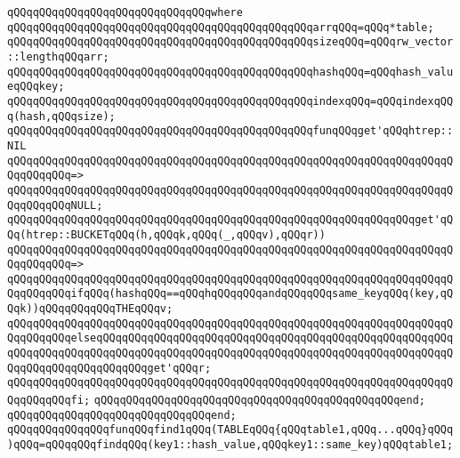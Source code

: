 \verb|qQQqqQQqqQQqqQQqqQQqqQQqqQQqqQQqwhere|\newline
\newline
\verb|qQQqqQQqqQQqqQQqqQQqqQQqqQQqqQQqqQQqqQQqqQQqqQQqarrqQQq=qQQq*table;|\newline
\verb|qQQqqQQqqQQqqQQqqQQqqQQqqQQqqQQqqQQqqQQqqQQqqQQqsizeqQQq=qQQqrw_vector::lengthqQQqarr;|\newline
\verb|qQQqqQQqqQQqqQQqqQQqqQQqqQQqqQQqqQQqqQQqqQQqqQQqhashqQQq=qQQqhash_valueqQQqkey;|\newline
\verb|qQQqqQQqqQQqqQQqqQQqqQQqqQQqqQQqqQQqqQQqqQQqqQQqindexqQQq=qQQqindexqQQq(hash,qQQqsize);|\newline
\newline
\verb|qQQqqQQqqQQqqQQqqQQqqQQqqQQqqQQqqQQqqQQqqQQqqQQqfunqQQqget'qQQqhtrep::NIL|\newline
\verb|qQQqqQQqqQQqqQQqqQQqqQQqqQQqqQQqqQQqqQQqqQQqqQQqqQQqqQQqqQQqqQQqqQQqqQQqqQQqqQQq=>|\newline
\verb|qQQqqQQqqQQqqQQqqQQqqQQqqQQqqQQqqQQqqQQqqQQqqQQqqQQqqQQqqQQqqQQqqQQqqQQqqQQqqQQqNULL;|\newline
\newline
\verb|qQQqqQQqqQQqqQQqqQQqqQQqqQQqqQQqqQQqqQQqqQQqqQQqqQQqqQQqqQQqqQQqget'qQQq(htrep::BUCKETqQQq(h,qQQqk,qQQq(_,qQQqv),qQQqr))|\newline
\verb|qQQqqQQqqQQqqQQqqQQqqQQqqQQqqQQqqQQqqQQqqQQqqQQqqQQqqQQqqQQqqQQqqQQqqQQqqQQqqQQq=>|\newline
\verb|qQQqqQQqqQQqqQQqqQQqqQQqqQQqqQQqqQQqqQQqqQQqqQQqqQQqqQQqqQQqqQQqqQQqqQQqqQQqqQQqifqQQq(hashqQQq==qQQqhqQQqqQQqandqQQqqQQqsame_keyqQQq(key,qQQqk))qQQqqQQqqQQqTHEqQQqv;|\newline
\verb|qQQqqQQqqQQqqQQqqQQqqQQqqQQqqQQqqQQqqQQqqQQqqQQqqQQqqQQqqQQqqQQqqQQqqQQqqQQqqQQqelseqQQqqQQqqQQqqQQqqQQqqQQqqQQqqQQqqQQqqQQqqQQqqQQqqQQqqQQqqQQqqQQqqQQqqQQqqQQqqQQqqQQqqQQqqQQqqQQqqQQqqQQqqQQqqQQqqQQqqQQqqQQqqQQqqQQqqQQqqQQqqQQqqQQqget'qQQqr;|\newline
\verb|qQQqqQQqqQQqqQQqqQQqqQQqqQQqqQQqqQQqqQQqqQQqqQQqqQQqqQQqqQQqqQQqqQQqqQQqqQQqqQQqfi;|\newline
\verb|qQQqqQQqqQQqqQQqqQQqqQQqqQQqqQQqqQQqqQQqqQQqqQQqend;|\newline
\verb|qQQqqQQqqQQqqQQqqQQqqQQqqQQqqQQqend;|\newline
\newline
\verb|qQQqqQQqqQQqqQQqfunqQQqfind1qQQq(TABLEqQQq{qQQqtable1,qQQq...qQQq}qQQq)qQQq=qQQqqQQqfindqQQq(key1::hash_value,qQQqkey1::same_key)qQQqtable1;|\newline
